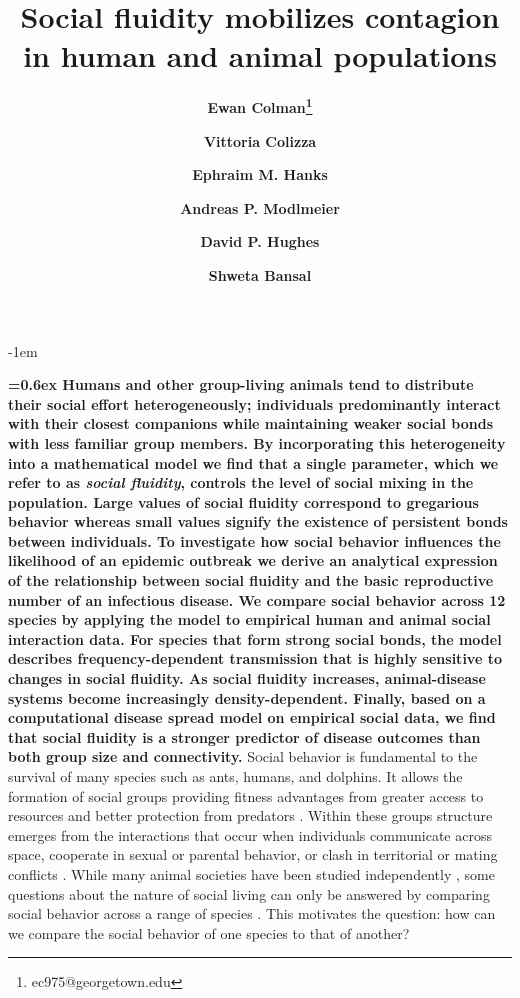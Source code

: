 \documentclass[twocolumn,8pt]{article}
\title{\vspace{-1cm} \huge \sffamily \bfseries Social fluidity mobilizes contagion in human and animal populations}
\author[1]{\small \sffamily \bfseries Ewan Colman\thanks{\scriptsize \sffamily ec975@georgetown.edu}}
\author[2]{\small \sffamily \bfseries Vittoria Colizza}
\author[3]{\small \sffamily \bfseries Ephraim M. Hanks}
\author[4]{\small \sffamily \bfseries Andreas P. Modlmeier}
\author[4]{\small \sffamily \bfseries David P. Hughes}
\author[1]{\small \sffamily \bfseries Shweta Bansal}
\affil[1]{\footnotesize \sffamily Department of Biology, Georgetown University}
\affil[2]{\footnotesize \sffamily INSERM, Paris}
\affil[3]{\footnotesize \sffamily Department of Statistics, Pennsylvania State University}
\affil[4]{\footnotesize \sffamily Department of Entomology, Pennsylvania State University}
\date{\vspace{-5ex}}
\begin{document}
\openup -1em

\maketitle
\footnotesize
\noindent
\textbf{\sffamily {}\font=0.6ex Humans and other group-living animals tend to distribute their social effort heterogeneously; individuals predominantly interact with their closest companions while maintaining weaker social bonds with less familiar group members. By incorporating this heterogeneity into a mathematical model we find that a single parameter, which we refer to as \emph{social fluidity}, controls the level of social mixing in the population. Large values of social fluidity correspond to gregarious behavior whereas small values signify the existence of persistent bonds between individuals. To investigate how social behavior influences the likelihood of an epidemic outbreak we derive an analytical expression of the relationship between social fluidity and the basic reproductive number of an infectious disease. We compare social behavior across 12 species by applying the model to empirical human and animal social interaction data. For species that form strong social bonds, the model describes frequency-dependent transmission that is highly sensitive to changes in social fluidity. As social fluidity increases, animal-disease systems become increasingly density-dependent. Finally, based on a computational disease spread model on empirical social data, we find that social fluidity is a stronger predictor of disease outcomes than  both group size and connectivity.}
\vspace{0.5cm}
\small
\lettrine{S}ocial behavior is fundamental to the survival of many species such as ants, humans, and dolphins. It allows the formation of social groups providing fitness advantages from greater access to resources and better protection from predators \cite{krause2002living}. Within these groups structure emerges from the interactions that occur when individuals communicate across space, cooperate in sexual or parental behavior, or clash in territorial or mating conflicts \cite{10.2307/2800384}. While many animal societies have been studied independently \cite{sah106633}, some questions about the nature of social living can only be answered by comparing social behavior across a range of species \cite{dunbar2010bondedness}. This motivates the question: how can we compare the social behavior of one species to that of another?
\end{document}
